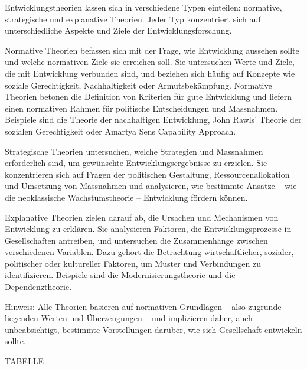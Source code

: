 \documentclass[
  letterpaper,
  DIV=11,
  numbers=noendperiod]{scrartcl}
\begin{document}
Entwicklungstheorien lassen sich in verschiedene Typen einteilen:
normative, strategische und explanative Theorien. Jeder Typ konzentriert
sich auf unterschiedliche Aspekte und Ziele der Entwicklungsforschung.

Normative Theorien befassen sich mit der Frage, wie Entwicklung aussehen
sollte und welche normativen Ziele sie erreichen soll. Sie untersuchen
Werte und Ziele, die mit Entwicklung verbunden sind, und beziehen sich
häufig auf Konzepte wie soziale Gerechtigkeit, Nachhaltigkeit oder
Armutsbekämpfung. Normative Theorien betonen die Definition von
Kriterien für gute Entwicklung und liefern einen normativen Rahmen für
politische Entscheidungen und Massnahmen. Beispiele sind die Theorie der
nachhaltigen Entwicklung, John Rawls' Theorie der sozialen Gerechtigkeit
oder Amartya Sens Capability Approach.

Strategische Theorien untersuchen, welche Strategien und Massnahmen
erforderlich sind, um gewünschte Entwicklungsergebnisse zu erzielen. Sie
konzentrieren sich auf Fragen der politischen Gestaltung,
Ressourcenallokation und Umsetzung von Massnahmen und analysieren, wie
bestimmte Ansätze -- wie die neoklassische Wachstumstheorie --
Entwicklung fördern können.

Explanative Theorien zielen darauf ab, die Ursachen und Mechanismen von
Entwicklung zu erklären. Sie analysieren Faktoren, die
Entwicklungsprozesse in Gesellschaften antreiben, und untersuchen die
Zusammenhänge zwischen verschiedenen Variablen. Dazu gehört die
Betrachtung wirtschaftlicher, sozialer, politischer oder kultureller
Faktoren, um Muster und Verbindungen zu identifizieren. Beispiele sind
die Modernisierungstheorie und die Dependenztheorie.

Hinweis: Alle Theorien basieren auf normativen Grundlagen -- also
zugrunde liegenden Werten und Überzeugungen -- und implizieren daher,
auch unbeabsichtigt, bestimmte Vorstellungen darüber, wie sich
Gesellschaft entwickeln sollte.

TABELLE
\end{document}
